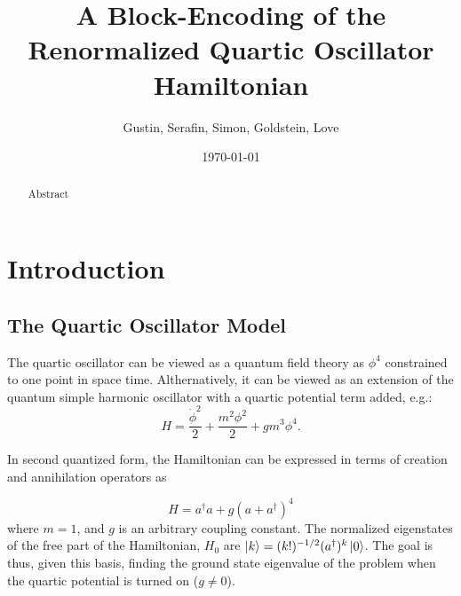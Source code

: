 \documentclass[%
 reprint,
nofootinbib,
 amsmath,amssymb,
 aps,
]{revtex4-2}
\numberwithin{equation}{section}
\begin{document}

\title{A Block-Encoding of the Renormalized Quartic Oscillator Hamiltonian}%

\author{Gustin, Serafin, Simon, Goldstein, Love}%

%



\date{\today}%

\begin{abstract}
Abstract
\end{abstract}

\maketitle

\section{Introduction}
\subsection{The Quartic Oscillator Model} 
The quartic oscillator can be viewed as a quantum field theory as $\phi^4$ constrained to
one point in space time. Althernatively, it can be viewed as an extension of the quantum
simple harmonic oscillator with a quartic potential term added, e.g.:
\begin{equation}
  H = \frac{\dot{\phi}^2}{2} + \frac{m^2\phi^2}{2} + gm^3\phi^4.
\end{equation}

In second quantized form, the Hamiltonian can be expressed in terms of creation and 
annihilation operators as

\begin{equation}
  \label{Hamiltonian}
  H = a^\dagger a + g(a + a^\dagger)^4
\end{equation}
where $m = 1$, and $g$ is an arbitrary coupling constant. The normalized eigenstates of
the free part of the Hamiltonian, $H_0$ are $\ket{k} = (k!)^{-1/2}(a^\dagger)^k\ket{0}$. The goal
is thus, given this basis, finding the ground state eigenvalue of the problem when the 
quartic potential is turned on ($g \neq 0$). 
\end{document}
